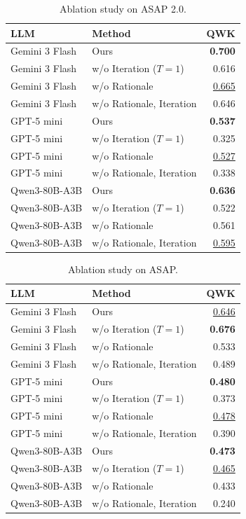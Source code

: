 \begin{table}[t]
\centering
\small
\caption{Ablation study on ASAP 2.0.}
\begin{tabular}{llr}
\toprule
LLM & Method & QWK \\
\midrule
Gemini 3 Flash & Ours & \textbf{0.700} \\
Gemini 3 Flash & w/o Iteration ($T=1$) & 0.616 \\
Gemini 3 Flash & w/o Rationale & \underline{0.665} \\
Gemini 3 Flash & w/o Rationale, Iteration & 0.646 \\
\midrule
GPT-5 mini & Ours & \textbf{0.537} \\
GPT-5 mini & w/o Iteration ($T=1$) & 0.325 \\
GPT-5 mini & w/o Rationale & \underline{0.527} \\
GPT-5 mini & w/o Rationale, Iteration & 0.338 \\
\midrule
Qwen3-80B-A3B & Ours & \textbf{0.636} \\
Qwen3-80B-A3B & w/o Iteration ($T=1$) & 0.522 \\
Qwen3-80B-A3B & w/o Rationale & 0.561 \\
Qwen3-80B-A3B & w/o Rationale, Iteration & \underline{0.595} \\
\bottomrule
\end{tabular}
\end{table}

\begin{table}[t]
\centering
\small
\caption{Ablation study on ASAP.}
\begin{tabular}{llr}
\toprule
LLM & Method & QWK \\
\midrule
Gemini 3 Flash & Ours & \underline{0.646} \\
Gemini 3 Flash & w/o Iteration ($T=1$) & \textbf{0.676} \\
Gemini 3 Flash & w/o Rationale & 0.533 \\
Gemini 3 Flash & w/o Rationale, Iteration & 0.489 \\
\midrule
GPT-5 mini & Ours & \textbf{0.480} \\
GPT-5 mini & w/o Iteration ($T=1$) & 0.373 \\
GPT-5 mini & w/o Rationale & \underline{0.478} \\
GPT-5 mini & w/o Rationale, Iteration & 0.390 \\
\midrule
Qwen3-80B-A3B & Ours & \textbf{0.473} \\
Qwen3-80B-A3B & w/o Iteration ($T=1$) & \underline{0.465} \\
Qwen3-80B-A3B & w/o Rationale & 0.433 \\
Qwen3-80B-A3B & w/o Rationale, Iteration & 0.240 \\
\bottomrule
\end{tabular}
\end{table}

